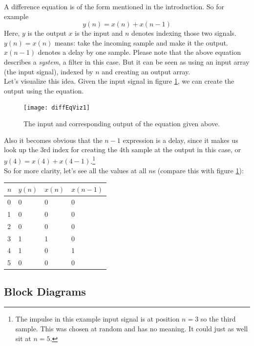 A difference equation is of the form mentioned in the introduction. So for example
\begin{equation}
	y(n) = x(n)+x(n-1)
	\label{eq:simple}
\end{equation}
Here, $y$ is the output $x$ is the input and $n$ denotes indexing those two signals.\\
$y(n)=x(n)$ means: take the incoming sample and make it the output. $x(n-1)$ denotes a delay by one sample. Please note that the above equation describes a \textit{system}, a filter in this case. But it can be seen as using an input array (the input signal), indexed by $n$ and creating an output array.\\
Let's visualize this idea. Given the input signal in figure \ref{fig:diffImpResp}, we can create the output using the equation.

\begin{figure}[h]
	\centering
	\texttt{[image: diffEqViz1]}
	\caption[shortCaption]
	{The input and corresponding output of the equation given above.}
	\label{fig:diffImpResp}
\end{figure}
 Also it becomes obvious that the $n-1$ expression is a delay, since it makes us look up the 3rd index for creating the 4th sample at the output in this case, or $y(4) = x(4)+x(4-1)$.\footnote{The impulse in this example input signal is at position $n=3$ so the third sample. This was chosen at random and has no meaning. It could just as well sit at $n=5$.}\\
 So for more clarity, let's see all the values at all $n$s (compare this with figure \ref{fig:diffImpResp}):

\begin{center}

\begin{tabular}{l|l|l|l}
	$n$ & $y(n)$ & $x(n)$ &$x(n-1)$\\
	\hline
	0 & 0 & 0 &0\\
	1 & 0 & 0 &0\\
	2 & 0 & 0 &0\\
	3 & 1 & 1 &0\\
	4 & 1 & 0 &1\\
	5 & 0 & 0 &0\\
\end{tabular}
\end{center}



\subsection{Block Diagrams} %
\label{sub:block}

